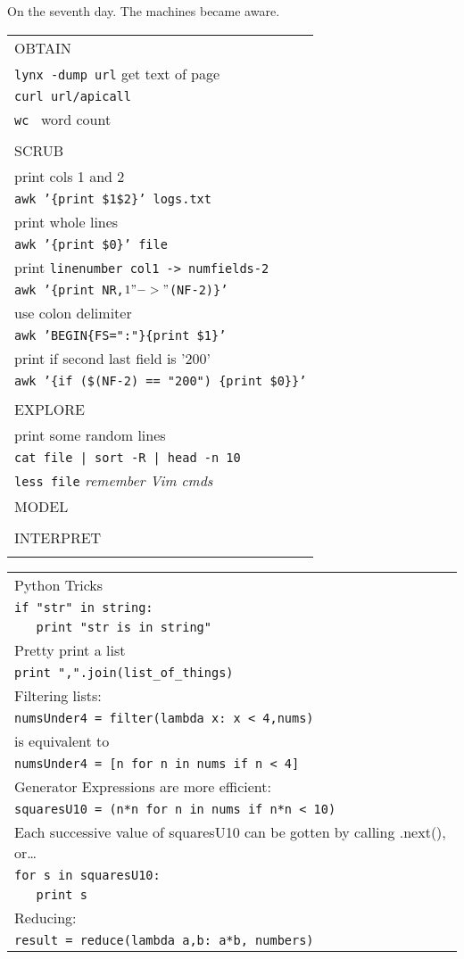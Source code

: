 
On the seventh day. The machines became aware.
\begin{tabular}{l}
OBTAIN\\
\texttt{lynx -dump url} get text of page\\
\texttt{curl url/apicall}\\
\texttt{wc } word count\\
\\
SCRUB\\
print cols 1 and 2\\
\texttt{awk '\{print \$1\$2\}' logs.txt}\\
print whole lines\\
\texttt{awk '\{print \$0\}' file}\\
print \texttt{linenumber col1 -> numfields-2}\\
\texttt{awk '\{print NR,$1 " -> " $(NF-2)\}'}\\
use colon delimiter\\
\texttt{awk 'BEGIN\{FS=":"\}\{print \$1\}'}\\
print if second last field is '200'\\
\texttt{awk '\{if (\$(NF-2) == "200") \{print \$0\}\}'}\\
\\
EXPLORE\\
print some random lines\\
\texttt{cat file | sort -R | head -n 10}\\
\texttt{less file} \emph{remember Vim cmds}\\
MODEL\\
\\
INTERPRET\\
\\ \end{tabular} 
\begin{tabular}{l}
Python Tricks\\
\texttt{if "str" in string:}\\
\texttt{\ \ \  print "str is in string"}\\
Pretty print a list\\
\texttt{print ",".join(list\_of\_things)}\\
Filtering lists:\\
\texttt{numsUnder4 = filter(lambda x: x < 4,nums)}\\
is equivalent to\\
\texttt{numsUnder4 = [n for n in nums if n < 4]}\\
Generator Expressions are more efficient:\\
\texttt{squaresU10 = (n*n for n in nums if n*n < 10)}\\
Each successive value of squaresU10 can be gotten by calling .next(), or\ldots\\
\texttt{for s in squaresU10:}\\
\texttt{\ \ \  print s}\\
Reducing:\\
\texttt{result = reduce(lambda a,b: a*b, numbers)}\\

\end{tabular}
